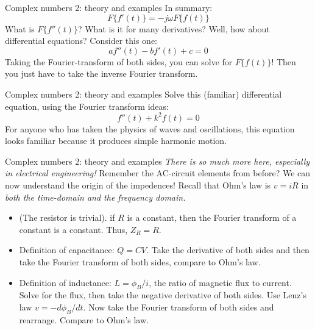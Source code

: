 \documentclass{beamer}
\begin{document}
\begin{frame}[fragile]{Complex numbers 2: theory and examples}
In summary:
\begin{equation}
\boxed{F\lbrace f'(t) \rbrace = -j\omega  F\lbrace f(t) \rbrace
}
\end{equation}
What is $F\lbrace f''(t) \rbrace$?  What is it for many derivatives?  Well, how about differential equations?  Consider this one:
\begin{equation}
a f''(t) - b f'(t) + c = 0
\end{equation}
Taking the Fourier-transform of both sides, you can solve for $F\lbrace f(t) \rbrace$!  Then you just have to take the inverse Fourier transform.
\end{frame}

\begin{frame}[fragile]{Complex numbers 2: theory and examples}
Solve this (familiar) differential equation, using the Fourier transform ideas:
\begin{equation}
f''(t) + k^2 f(t) = 0
\end{equation}
For anyone who has taken the physics of waves and oscillations, this equation looks familiar because it produces simple harmonic motion.
\end{frame}

\begin{frame}[fragile]{Complex numbers 2: theory and examples}
\small
\textit{\alert{There is so much more here, especially in electrical engineering!}} Remember the AC-circuit elements from before? We can now understand the origin of the impedences!  Recall that Ohm's law is $v = i R$ in \textit{both the time-domain and the frequency domain.}
\begin{itemize}
\item (The resistor is trivial). if $R$ is a constant, then the Fourier transform of a constant is a constant.  Thus, $Z_R = R$.
\item Definition of capacitance: $Q = CV$.  Take the derivative of both sides and then take the Fourier transform of both sides, compare to Ohm's law.
\item Definition of inductance: $L = \phi_B/i$, the ratio of magnetic flux to current. Solve for the flux, then take the negative derivative of both sides.  Use Lenz's law $v = -d\phi_B/dt$.  Now take the Fourier transform of both sides and rearrange.  Compare to Ohm's law.
\end{itemize}
\end{frame}
\end{document}
